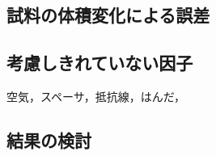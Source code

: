 \documentclass[uplatex,dvipdfmx,a4paper,10pt]{jsarticle}
\begin{document}
\subsection{試料の体積変化による誤差}
\subsection{考慮しきれていない因子}
空気，スペーサ，抵抗線，はんだ，
\subsection{結果の検討}

\end{document}
